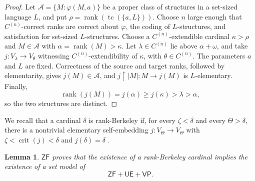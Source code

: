 \documentclass[11pt,a4paper]{amsart}
\newcommand{\VP}{\mathsf{VP}}
\newcommand{\ZF}{\mathsf{ZF}}
\newcommand{\tc}{\operatorname{tc}}
\newcommand{\rank}{\operatorname{rank}}
\newcommand{\restr}{\mathbin{\upharpoonright}}
\newcommand{\crit}{\operatorname{crit}}
\newcommand{\UE}{\mathsf{UE}}
\theoremstyle{plain}
\newtheorem{lemma}[theorem]{Lemma}
\theoremstyle{definition}
\theoremstyle{remark}
\begin{document}
\begin{proof}
 Let $\mathcal A=\{M:\varphi(M,a)\}$ be a proper class of structures in a set-sized language $L$, and put $\rho=\rank(\tc(\{a,L\}))$.  Choose $n$ large enough that $C^{(n)}$-correct ranks are correct about $\varphi$, the coding of $L$-structures, and satisfaction for set-sized $L$-structures.  Choose a $C^{(n)}$-extendible cardinal $\kappa>\rho$ and $M\in\mathcal A$ with $\alpha=\rank(M)>\kappa$.  Let $\lambda\in C^{(n)}$ lie above $\alpha+\omega$, and take $j:V_\lambda\longrightarrow V_\theta$ witnessing $C^{(n)}$-extendibility of $\kappa$, with $\theta\in C^{(n)}$.  The parameters $a$ and $L$ are fixed.  Correctness of the source and target ranks, followed by elementarity, gives $j(M)\in\mathcal A$, and $j\restr|M|:M\to j(M)$ is $L$-elementary.  Finally,
\[
\rank(j(M))=j(\alpha)\geq j(\kappa)>\lambda>\alpha,
\]
so the two structures are distinct.
\end{proof}

We recall that a cardinal $\delta$ is rank-Berkeley if, for every $\zeta<\delta$ and every $\Theta>\delta$, there is a nontrivial elementary self-embedding $j:V_\Theta\to V_\Theta$ with $\zeta<\crit(j)<\delta$ and $j(\delta)=\delta$ \cite[Definition~4.4]{Mohammd}.

\begin{lemma}\label{lem:rank-Berkeley-descent}
$\ZF$ proves that the existence of a rank-Berkeley cardinal implies the existence of a set model of
\[
\ZF+\UE+\VP.
\]
\end{lemma}
\end{document}

